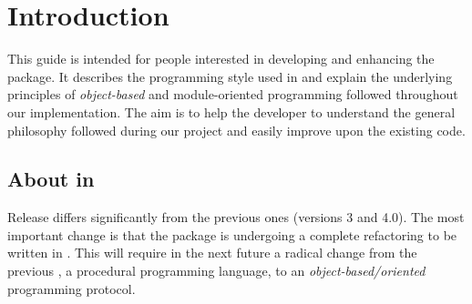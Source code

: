 \chapter{Introduction}

This guide is intended for people interested in developing and enhancing
the \PR package. It describes the \fort programming style used in \PR and
explain the underlying principles of {\em object-based} and module-oriented
programming followed throughout our implementation.  The aim is to help the
developer to understand the general philosophy followed during our project
and easily improve upon the existing code.

\section{About \fort in \PR}

Release \PR differs significantly from the previous ones (versions 3 and
4.0).  The most important change is that the package is undergoing a complete
refactoring to be written in \fort. This will require in the next future a
radical change from the previous \oldfort, a procedural programming language,
to an {\em object-based/oriented} programming protocol.

